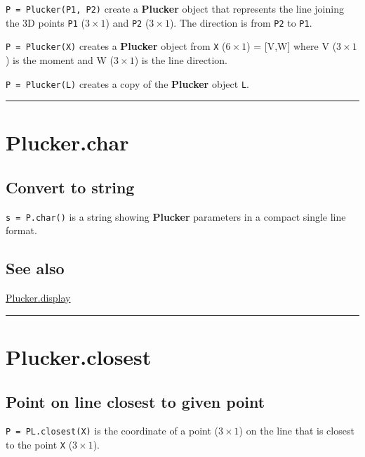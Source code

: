 \texttt{P = Plucker(P1, P2)} create a \textbf{\color{red} Plucker} object that represents
the line joining the 3D points \texttt{P1} ($3 \times 1$) and \texttt{P2} ($3 \times 1$). The direction
is from \texttt{P2} to \texttt{P1}.



\texttt{P = Plucker(X)} creates a \textbf{\color{red} Plucker} object from \texttt{X} ($6 \times 1$) = [V,W] where
V ($3 \times 1$) is the moment and W ($3 \times 1$) is the line direction.



\texttt{P = Plucker(L)} creates a copy of the \textbf{\color{red} Plucker} object \texttt{L}.

\vspace{1.5ex}\hrule

\hypertarget{Plucker.char}{\section*{Plucker.char}}
\subsection*{Convert to string}


\texttt{s = P.char()} is a string showing \textbf{\color{red} Plucker} parameters in a compact single
line format.


\subsection*{See also}


\hyperlink{Plucker.display}{\color{blue} Plucker.display}

\vspace{1.5ex}\hrule

\hypertarget{Plucker.closest}{\section*{Plucker.closest}}
\subsection*{Point on line closest to given point}


\texttt{P = PL.closest(X)} is the coordinate of a point ($3 \times 1$) on the line that is
closest to the point \texttt{X} ($3 \times 1$).



